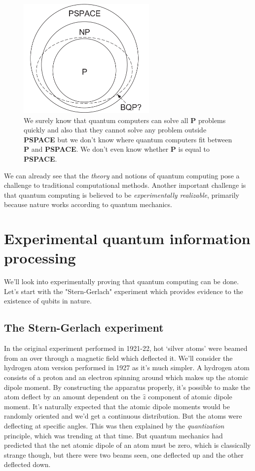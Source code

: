 \begin{figure}[H]
    \centering
    \includegraphics[width=0.6\textwidth]{images/bqp_pspace.png}
    \caption{We surely know that quantum computers can solve all \textbf{P} problems quickly and also that they cannot solve any problem outside \textbf{PSPACE} but we don't know where quantum computers fit between \textbf{P} and \textbf{PSPACE}. We don't even know whether \textbf{P} is equal to \textbf{PSPACE}.}
    \label{fig:bqp-pspace}
\end{figure}
We can already see that the \textit{theory} and notions of quantum computing pose a challenge to traditional computational methods. Another important challenge is that quantum computing is believed to be \textit{experimentally realizable}, primarily because nature works according to quantum mechanics.

\section{Experimental quantum information processing}
We'll look into experimentally proving that quantum computing can be done. Let's start with the "Stern-Gerlach" experiment which provides evidence to the existence of qubits in nature.
\subsection{The Stern-Gerlach experiment}
In the original experiment performed in 1921-22, hot `silver atoms' were beamed from an over through a magnetic field which deflected it. We'll consider the hydrogen atom version performed in 1927 as it's much simpler. A hydrogen atom consists of a proton and an electron spinning around which makes up the atomic dipole moment. By constructing the apparatus properly, it's possible to make the atom deflect by an amount dependent on the $\hat{z}$ component of atomic dipole moment. It's naturally expected that the atomic dipole moments would be randomly oriented and we'd get a continuous distribution. But the atoms were deflecting at specific angles. This was then explained by the \textit{quantization} principle, which was trending at that time. But quantum mechanics had predicted that the net atomic dipole of an atom must be zero, which is classically strange though, but there were two beams seen, one deflected up and the other deflected down.

